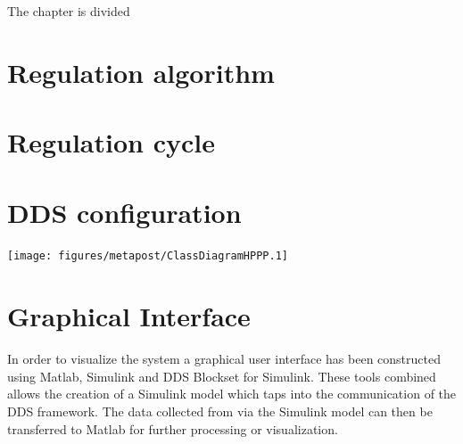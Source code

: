 \noindent The chapter is divided

\section{Regulation algorithm}

\section{Regulation cycle}

\section{DDS configuration}


\texttt{[image: figures/metapost/ClassDiagramHPPP.1]}

\section{Graphical Interface} \label{sec:graphicalInterface}
In order to visualize the system a graphical user interface has been constructed using Matlab, Simulink and DDS Blockset for Simulink.
These tools combined allows the creation of a Simulink model which taps into the communication of the DDS framework.
The data collected from via the Simulink model can then be transferred to Matlab for further processing or visualization.

